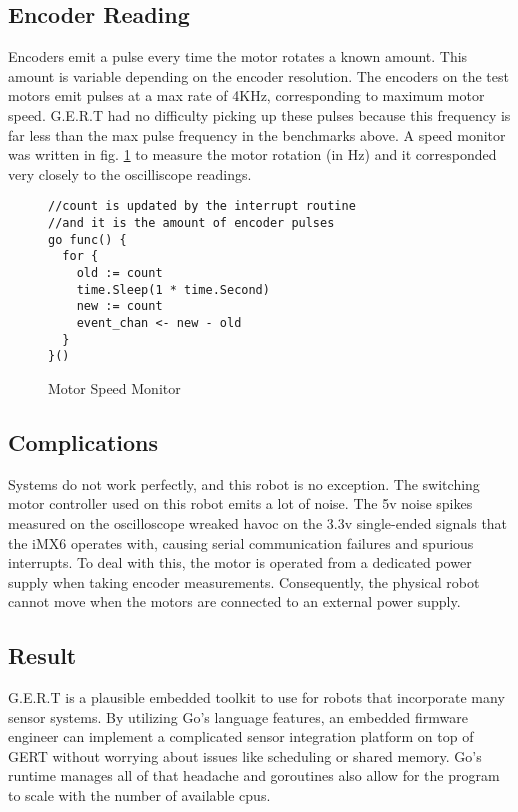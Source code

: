 \clearpage
\subsection{Encoder Reading}
Encoders emit a pulse every time the motor rotates a known amount. This amount is variable depending on the
encoder resolution. The encoders on the test motors emit pulses at a max rate of 4KHz, corresponding to
maximum motor speed. G.E.R.T had no difficulty picking up these pulses because this frequency is far less than
the max pulse frequency in the benchmarks above. A speed monitor was written in fig. \ref{fig:speedmon}
to measure the motor rotation (in Hz) and it corresponded very closely to the oscilliscope readings.

\begin{figure}[h]
\begin{center}
\begin{lstlisting}
//count is updated by the interrupt routine
//and it is the amount of encoder pulses
go func() {
  for {
    old := count
    time.Sleep(1 * time.Second)
    new := count
    event_chan <- new - old
  }
}()
\end{lstlisting}
\end{center}
  \caption{Motor Speed Monitor} \label{fig:speedmon}
\end{figure}

\subsection{Complications}
Systems do not work perfectly, and this robot is no exception. The switching motor controller used
on this robot emits a lot of noise. The 5v noise spikes measured on the oscilloscope wreaked havoc
on the 3.3v single-ended signals that the iMX6 operates with, causing serial communication failures
and spurious interrupts. To deal with this, the motor is operated from a dedicated power supply
when taking encoder measurements. Consequently, the physical robot cannot move when the motors
are connected to an external power supply.

\subsection{Result}
G.E.R.T is a plausible embedded toolkit to use for robots that incorporate many sensor systems.
By utilizing Go's language features, an embedded firmware engineer can implement a complicated sensor integration
platform on top of GERT without worrying about issues like scheduling or shared memory. Go's runtime manages all
of that headache and goroutines also allow for the program to scale with the number of available cpus.


